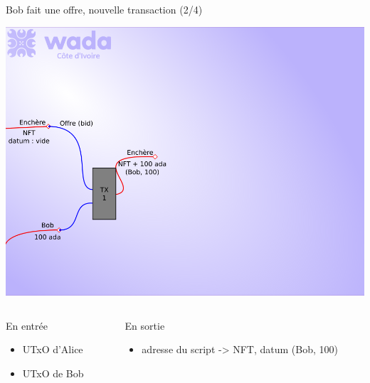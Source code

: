 \documentclass[presentation]{beamer}
\begin{document}
\begin{frame}[label={sec:org3eaac3c}]{Bob fait une offre, nouvelle transaction (2/4)}
\begin{center}
\includegraphics[height=.55\textheight]{Images/enchere_02.png}
\end{center}

\begin{columns}
\begin{column}{0.3\columnwidth}
\begin{block}{En entrée}
\begin{itemize}
\item UTxO d'Alice
\item UTxO de Bob
\end{itemize}
\end{block}
\end{column}
\begin{column}{0.7\columnwidth}
\begin{block}{En sortie}
\begin{itemize}
\item adresse du script -> NFT, datum (Bob, 100)
\end{itemize}
\end{block}
\end{column}
\end{columns}
\end{frame}
\end{document}
